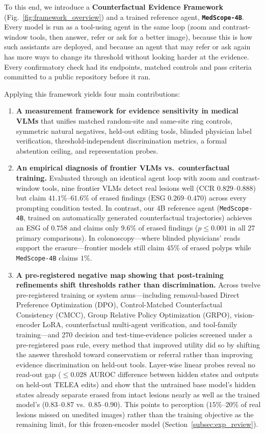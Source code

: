 \documentclass[journal]{IEEEtran}
\begin{document}
To this end, we introduce a \textbf{Counterfactual Evidence Framework} (Fig.~\ref{fig:framework_overview}) and a trained reference agent, \textbf{\texttt{MedScope-4B}}. Every model is run as a tool-using agent in the same loop (zoom and contrast-window tools, then answer, refer or ask for a better image), because this is how such assistants are deployed, and because an agent that may refer or ask again has more ways to change its threshold without looking harder at the evidence. Every confirmatory check had its endpoints, matched controls and pass criteria committed to a public repository before it ran.

Applying this framework yields four main contributions:
\begin{enumerate}[leftmargin=*,nosep]
    \item \textbf{A measurement framework for evidence sensitivity in medical VLMs} that unifies matched random-site and same-site ring controls, symmetric natural negatives, held-out editing tools, blinded physician label verification, threshold-independent discrimination metrics, a formal abstention ceiling, and representation probes.
    \item \textbf{An empirical diagnosis of frontier VLMs vs.\ counterfactual training.} Evaluated through an identical agent loop with zoom and contrast-window tools, nine frontier VLMs detect real lesions well ($\text{CCR } 0.829\text{--}0.888$) but claim $41.1\%\text{--}61.6\%$ of erased findings ($\text{ESG } 0.269\text{--}0.470$) across every prompting condition tested. In contrast, our 4B reference agent (\texttt{MedScope-4B}, trained on automatically generated counterfactual trajectories) achieves an ESG of $0.758$ and claims only $9.6\%$ of erased findings ($p \le 0.001$ in all 27 primary comparisons). In colonoscopy---where blinded physicians' reads support the erasure---frontier models still claim $45\%$ of erased polyps while \texttt{MedScope-4B} claims $1\%$.
    \item \textbf{A pre-registered negative map showing that post-training refinements shift thresholds rather than discrimination.} Across twelve pre-registered training or system arms---including removal-based Direct Preference Optimization (DPO), Control-Matched Counterfactual Consistency (CMCC), Group Relative Policy Optimization (GRPO), vision-encoder LoRA, counterfactual multi-agent verification, and tool-family training---and 270 decision and test-time-evidence policies screened under a pre-registered pass rule, every method that improved utility did so by shifting the answer threshold toward conservatism or referral rather than improving evidence discrimination on held-out tools. Layer-wise linear probes reveal no read-out gap ($\le 0.028$ AUROC difference between hidden states and outputs on held-out TELEA edits) and show that the untrained base model's hidden states already separate erased from intact lesions nearly as well as the trained model's ($0.83\text{--}0.87$ vs.\ $0.85\text{--}0.90$). This points to perception ($15\%\text{--}20\%$ of real lesions missed on unedited images) rather than the training objective as the remaining limit, for this frozen-encoder model (Section~\ref{subsec:exp_review}).

\end{enumerate}
\end{document}
